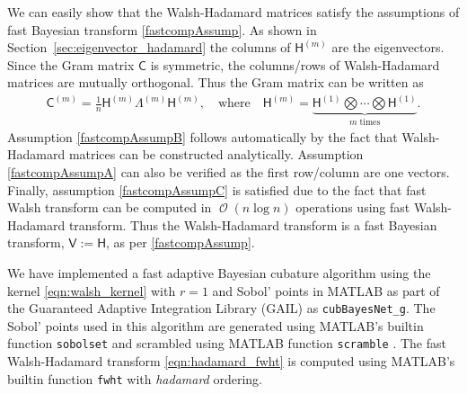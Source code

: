 \documentclass{iitthesis}          %
\DeclareMathOperator{\Order}{{\mathcal O}}
\newcommand{\mSigma}{\mathsf{\Sigma}}
\newcommand{\mB}{\mathsf{B}}
\newcommand{\mA}{\mathsf{A}}
\newcommand{\mC}{\mathsf{C}}
\newcommand{\mH}{\mathsf{H}}
\newcommand{\mLambda}{\mathsf{\Lambda}}
\newcommand{\mV}{\mathsf{V}}
\newcommand{\code}[1]{\texttt{#1}}
\newcommand{\JRNote}[1]{}
\begin{document}

We can easily show that the Walsh-Hadamard matrices satisfy the assumptions of fast Bayesian transform \eqref{fastcompAssump}. As shown in Section~\ref{sec:eigenvector_hadamard} the columns of $\mH^{({m})}$ are the eigenvectors. Since the Gram matrix $\mC$ is symmetric, the columns/rows of Walsh-Hadamard matrices are mutually orthogonal. Thus the Gram matrix can be written as 
\begin{align}
\label{eqn:hadamard_fwht}
\mC^{(m)} = \frac{1}{n} \mH^{(m)} \mLambda^{(m)} \mH^{(m)}, \quad \text{where} \quad \mH^{({m})} = \underbrace{ \mH^{(1)} \bigotimes \cdots \bigotimes \mH^{(1)} }_{m \; \text{times}}.
\end{align}
Assumption \eqref{fastcompAssumpB} follows automatically by the fact that Walsh-Hadamard matrices can be constructed analytically. Assumption \eqref{fastcompAssumpA} can also be verified as the first row/column are one vectors. Finally, assumption \eqref{fastcompAssumpC} is satisfied due to the fact that fast Walsh transform can be computed in $\Order({n \log n})$ operations using fast Walsh-Hadamard transform.
Thus the Walsh-Hadamard transform is a fast Bayesian transform, $\mV := \mH$, as per \eqref{fastcompAssump}.

We have implemented a fast adaptive Bayesian cubature algorithm using the kernel \eqref{eqn:walsh_kernel} with $r=1$ and Sobol' points \cite{BraFox88} in MATLAB as part of the Guaranteed Adaptive Integration Library (GAIL) \cite{ChoEtal17b} as \allowbreak \code{cubBayesNet\_g}. The Sobol' points used in this algorithm are generated using MATLAB's builtin function \code{sobolset} and scrambled using MATLAB function \code{scramble} \cite{HonHic00a}. The fast Walsh-Hadamard transform \eqref{eqn:hadamard_fwht} is computed using MATLAB's builtin function \code{fwht} with \emph{hadamard} ordering. 
\end{document}
